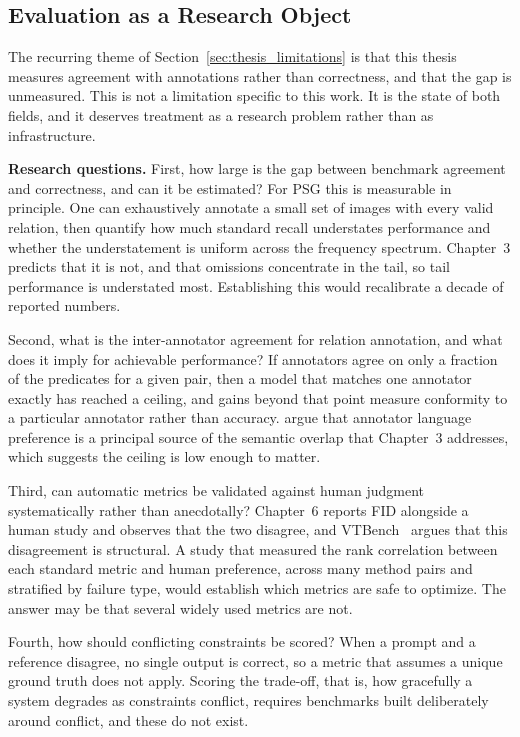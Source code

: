 \subsection{Evaluation as a Research Object}
\label{sec:future_evaluation}
The recurring theme of Section~\ref{sec:thesis_limitations} is that this thesis measures agreement with annotations rather than correctness, and that the gap is unmeasured. This is not a limitation specific to this work. It is the state of both fields, and it deserves treatment as a research problem rather than as infrastructure.

\noindent \textbf{Research questions.}
First, how large is the gap between benchmark agreement and correctness, and can it be estimated? For PSG this is measurable in principle. One can exhaustively annotate a small set of images with every valid relation, then quantify how much standard recall understates performance and whether the understatement is uniform across the frequency spectrum. Chapter~3 predicts that it is not, and that omissions concentrate in the tail, so tail performance is understated most. Establishing this would recalibrate a decade of reported numbers.

Second, what is the inter-annotator agreement for relation annotation, and what does it imply for achievable performance? If annotators agree on only a fraction of the predicates for a given pair, then a model that matches one annotator exactly has reached a ceiling, and gains beyond that point measure conformity to a particular annotator rather than accuracy. \citet{li2024semantics} argue that annotator language preference is a principal source of the semantic overlap that Chapter~3 addresses, which suggests the ceiling is low enough to matter.

Third, can automatic metrics be validated against human judgment systematically rather than anecdotally? Chapter~6 reports FID alongside a human study and observes that the two disagree, and VTBench~\citep{hu2025vtbench} argues that this disagreement is structural. A study that measured the rank correlation between each standard metric and human preference, across many method pairs and stratified by failure type, would establish which metrics are safe to optimize. The answer may be that several widely used metrics are not.

Fourth, how should conflicting constraints be scored? When a prompt and a reference disagree, no single output is correct, so a metric that assumes a unique ground truth does not apply. Scoring the trade-off, that is, how gracefully a system degrades as constraints conflict, requires benchmarks built deliberately around conflict, and these do not exist.

